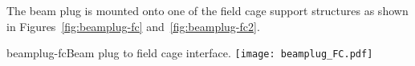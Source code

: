 The beam plug is mounted onto one of the field cage support structures as shown in Figures~\ref{fig:beamplug-fc} and~\ref{fig:beamplug-fc2}. 
\begin{cdrfigure}{beamplug-fc}{Beam plug to field cage interface.}
\texttt{[image: beamplug\_FC.pdf]}
\end{cdrfigure}




